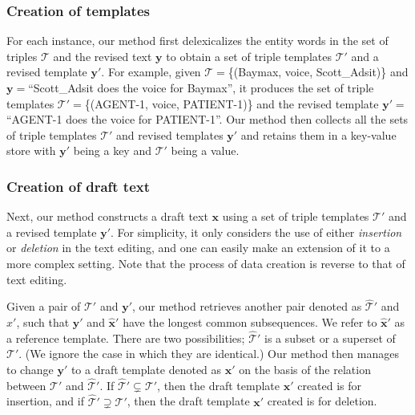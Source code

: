 \documentclass[11pt,a4paper]{article}
\begin{document}
\subsubsection*{Creation of templates}

For each instance, our method first delexicalizes the entity words in the set of triples $\mathcal{T}$ and the revised text $\boldsymbol{y}$ to obtain a set of triple templates $\mathcal{T}'$ and a revised template $\boldsymbol{y}'$. For example, given $\mathcal{T} =$\{(Baymax, voice, Scott\_Adsit)\} and $\boldsymbol{y} = $``Scott\_Adsit does the voice for Baymax'', it produces the set of triple templates $\mathcal{T}'=$\{(AGENT-1, voice, PATIENT-1)\} and the revised template $\boldsymbol{y}'=$``AGENT-1 does the voice for PATIENT-1''.
Our method then collects all the sets of triple templates $\mathcal{T}'$ and revised templates $\boldsymbol{y}'$ and retains them in a key-value store with $\boldsymbol{y}'$ being a key and $\mathcal{T}'$ being a value.

\subsubsection*{Creation of draft text}

Next, our method constructs a draft text $\boldsymbol{x}$ using a set of triple templates $\mathcal{T}'$ and a revised template $\boldsymbol{y}'$. For simplicity, it only considers the use of either \textit{insertion} or \textit{deletion} in the text editing, and one can easily make an extension of it to a more complex setting.  Note that the process of data creation is reverse to that of text editing.

Given a pair of $\mathcal{T}'$ and $\boldsymbol{y}'$, our method retrieves another pair denoted as $\hat{\mathcal{T}}'$ and $\hat{x}'$, such that $\boldsymbol{y}'$ and  $\hat{\boldsymbol{x}}'$ have the longest common subsequences. We refer to $\hat{\boldsymbol{x}}'$ as a reference template. There are two possibilities; $\hat{\mathcal{T}}'$ is a subset or a superset of $\mathcal{T}'$. (We ignore the case in which they are identical.) Our method then manages to change $\boldsymbol{y}'$ to a draft template denoted as $\boldsymbol{x}'$ on the basis of the relation between $\mathcal{T}'$ and $\hat{\mathcal{T}}'$. If $\hat{\mathcal{T}}' \subsetneq \mathcal{T}'$, then the draft template $\boldsymbol{x}'$ created is for insertion, and if $\hat{\mathcal{T}}' \supsetneq \mathcal{T}'$, then the draft template $\boldsymbol{x}'$ created is for deletion.
\end{document}
